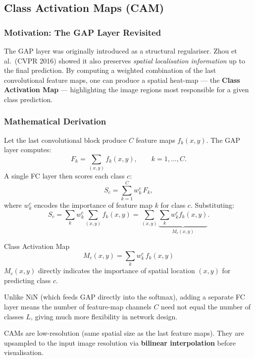 \documentclass[11pt,a4paper]{article}
\newcommand{\term}[1]{\textcolor{DefGreen}{\textbf{#1}}}
\begin{document}
\subsection{Class Activation Maps (CAM)}
\label{sec:cam}

\subsubsection{Motivation: The GAP Layer Revisited}

The GAP layer was originally introduced as a structural regulariser. Zhou et al.\ (CVPR 2016) showed it also preserves \emph{spatial localisation information} up to the final prediction. By computing a weighted combination of the last convolutional feature maps, one can produce a spatial heat-map — the \term{Class Activation Map} — highlighting the image regions most responsible for a given class prediction.

\subsubsection{Mathematical Derivation}

Let the last convolutional block produce $C$ feature maps $f_k(x,y)$. The GAP layer computes:
\[
F_k = \sum_{(x,y)} f_k(x,y), \qquad k=1,\ldots,C.
\]
A single FC layer then scores each class $c$:
\[
S_c = \sum_{k=1}^{C} w_k^c \, F_k,
\]
where $w_k^c$ encodes the importance of feature map $k$ for class $c$. Substituting:
\[
S_c = \sum_k w_k^c \sum_{(x,y)} f_k(x,y) = \sum_{(x,y)} \underbrace{\sum_k w_k^c f_k(x,y)}_{M_c(x,y)}.
\]

\begin{defbox}{Class Activation Map}
\[
M_c(x,y) = \sum_k w_k^c \, f_k(x,y)
\]
$M_c(x,y)$ directly indicates the importance of spatial location $(x,y)$ for predicting class $c$.
\end{defbox}

\begin{notebox}
Unlike NiN (which feeds GAP directly into the softmax), adding a separate FC layer means the number of feature-map channels $C$ need not equal the number of classes $L$, giving much more flexibility in network design.
\end{notebox}

CAMs are low-resolution (same spatial size as the last feature maps). They are upsampled to the input image resolution via \textbf{bilinear interpolation} before visualisation.
\end{document}
